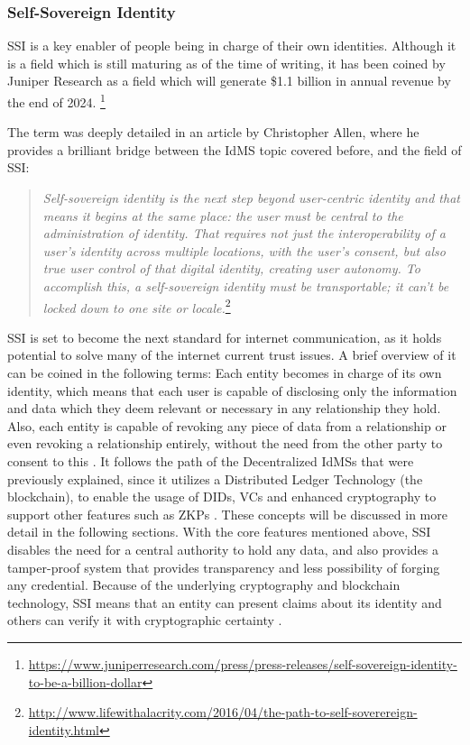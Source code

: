\subsubsection{Self-Sovereign Identity}
\label{subsubsec:self-sovereign_identity}

\acrfull{SSI} is a key enabler of people being in charge of their own identities. Although it is a field which is still maturing as of the time of writing, it has been coined by Juniper Research as a field which will generate \$1.1 billion in annual revenue by the end of 2024.  \footnote{\url{https://www.juniperresearch.com/press/press-releases/self-sovereign-identity-to-be-a-billion-dollar}}

The term was deeply detailed in an article by Christopher Allen, where he provides a brilliant bridge between the IdMS topic covered before, and the field of SSI:

\begin{quote}
\textit{Self-sovereign identity is the next step beyond user-centric identity and that means it begins at the same place: the user must be central to the administration of identity. That requires not just the interoperability of a user’s identity across multiple locations, with the user’s consent, but also true user control of that digital identity, creating user autonomy. To accomplish this, a self-sovereign identity must be transportable; it can’t be locked down to one site or locale.}\footnote{\url{http://www.lifewithalacrity.com/2016/04/the-path-to-self-soverereign-identity.html}}
\end{quote}

SSI is set to become the next standard for internet communication, as it holds potential to solve many of the internet current trust issues. A brief overview of it can be coined in the following terms: Each entity becomes in charge of its own identity, which means that each user is capable of disclosing only the information and data which they deem relevant or necessary in any relationship they hold. Also, each entity is capable of revoking any piece of data from a relationship or even revoking a relationship entirely, without the need from the other party to consent to this \cite{lo2019analysis} \cite{10.1145/3384943.3409436}. It follows the path of the Decentralized IdMSs that were previously explained, since it utilizes a Distributed Ledger Technology (the blockchain), to enable the usage of \glspl{DID}, \glspl{VC} and enhanced cryptography to support other features such as \glspl{ZKP} \cite{bertino2010identity}. These concepts will be discussed in more detail in the following sections. With the core features mentioned above, SSI disables the need for a central authority to hold any data, and also provides a tamper-proof system that provides transparency and less possibility of forging any credential. Because of the underlying cryptography and blockchain technology, SSI means that an entity can present claims about its identity and others can verify it with cryptographic certainty \cite{liu2020blockchain}. 


